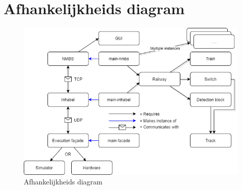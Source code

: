 \documentclass{article}
\begin{document}
\section{Afhankelijkheids diagram}
\begin{figure}[h]
        \centering
        \includegraphics[width=\textwidth]{Images/software-architecture PP2.png}
        \caption{Afhankelijkheids diagram}
\end{figure}
\end{document}

